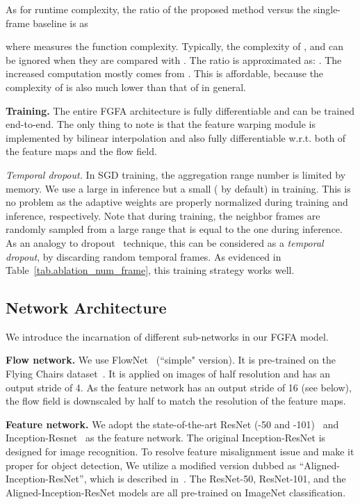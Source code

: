 \documentclass[10pt,twocolumn,letterpaper]{article}
\begin{document}
As for runtime complexity, the ratio of the proposed method versus the single-frame baseline is as

where  measures the function complexity. Typically, the complexity of ,  and  can be ignored when they are compared with . The ratio is approximated as: 
. The increased computation mostly comes from . This is affordable, because the complexity of  is also much lower than that of  in general.

\textbf{Training.} The entire FGFA architecture is fully differentiable and can be trained end-to-end. The only thing to note is that the feature warping module is implemented by bilinear interpolation and also fully differentiable w.r.t. both of the feature maps and the flow field.

\emph{Temporal dropout.} In SGD training, the aggregation range number  is limited by memory. We use a large  in inference but a small ( by default) in training. This is no problem as the adaptive weights are properly normalized during training and inference, respectively. Note that during training, the neighbor frames are randomly sampled from a large range that is equal to the one during inference. As an analogy to dropout~\cite{srivastava2014dropout} technique, this can be considered as a \emph{temporal dropout}, by discarding random temporal frames. As evidenced in Table~\ref{tab.ablation_num_frame}, this training strategy works well.

\subsection{Network Architecture}

We introduce the incarnation of different sub-networks in our FGFA model.

\textbf{Flow network.} We use FlowNet~\cite{dosovitskiy2015flownet} (``simple" version). It is pre-trained on the Flying Chairs dataset~\cite{dosovitskiy2015flownet}. It is applied on images of half resolution and has an output stride of 4. As the feature network has an output stride of 16 (see below), the flow field is downscaled by half to match the resolution of the feature maps.

\textbf{Feature network.} We adopt the state-of-the-art ResNet (-50 and -101)~\cite{he2016deep} and Inception-Resnet~\cite{szegedy2016inception} as the feature network. The original Inception-ResNet is designed for image recognition. To resolve feature misalignment issue and make it proper for object detection, We utilize a modified version dubbed as ``Aligned-Inception-ResNet'', which is described in~\cite{dai2017deformable}. The ResNet-50, ResNet-101, and the Aligned-Inception-ResNet models are all pre-trained on ImageNet classification.
\end{document}

